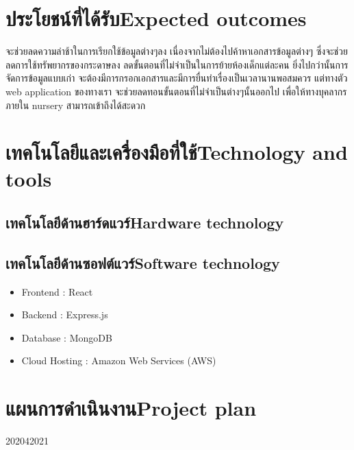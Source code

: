 \section{\ifcpe ประโยชน์ที่ได้รับ\else Expected outcomes\fi}
จะช่วยลดความล่าช้าในการเรียกใช้ข้อมูลต่างๆลง    
  เนื่องจากไม่ต้องไปค้าหาเอกสารข้อมูลต่างๆ ซึ่งจะช่วยลดการใช้ทรัพยากรของกระดาษลง  ลดขั้นตอนที่ไม่จำเป็นในการย้ายห้องเด็กแต่ละคน ยิ่งไปกว่านั้นการจัดการข้อมูลแบบเก่า  จะต้องมีการกรอกเอกสารและมีการยื่นทำเรื่องเป็นเวลานานพอสมควร แต่ทางตัว web application ของทางเรา จะช่วยลดทอนขั้นตอนที่ไม่จำเป็นต่างๆนั้นออกไป เพื่อให้ทางบุคลากรภายใน nursery สามารถเข้าถึงได้สะดวก

\section{\ifcpe เทคโนโลยีและเครื่องมือที่ใช้\else Technology and tools\fi}

\subsection{\ifcpe เทคโนโลยีด้านฮาร์ดแวร์\else Hardware technology\fi}


\subsection{\ifcpe เทคโนโลยีด้านซอฟต์แวร์\else Software technology\fi}
\begin{itemize}
    \item Frontend : React 	
    \item Backend : Express.js 
    \item Database : MongoDB
    \item Cloud Hosting : Amazon Web Services (AWS)
\end{itemize}



\section{\ifcpe แผนการดำเนินงาน\else Project plan\fi}

\begin{plan}{11}{2020}{4}{2021}
\end{plan}

